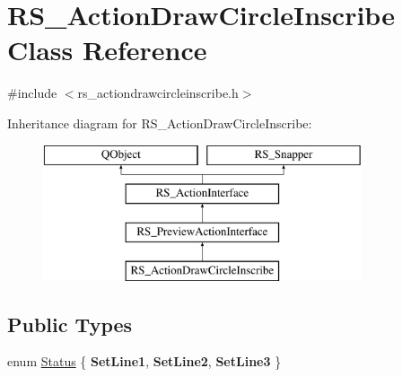 \hypertarget{classRS__ActionDrawCircleInscribe}{\section{R\-S\-\_\-\-Action\-Draw\-Circle\-Inscribe Class Reference}
\label{classRS__ActionDrawCircleInscribe}
}


{\ttfamily \#include $<$rs\-\_\-actiondrawcircleinscribe.\-h$>$}

Inheritance diagram for R\-S\-\_\-\-Action\-Draw\-Circle\-Inscribe\-:\begin{figure}[H]
\begin{center}
\leavevmode
\includegraphics[height=4.000000cm]{classRS__ActionDrawCircleInscribe}
\end{center}
\end{figure}
\subsection*{Public Types}
\begin{DoxyCompactItemize}
\item 
enum \hyperlink{classRS__ActionDrawCircleInscribe_a8fc9869ac02de3e075f94e0a39b8eacc}{Status} \{ {\bfseries Set\-Line1}, 
{\bfseries Set\-Line2}, 
{\bfseries Set\-Line3}
 \}
\end{DoxyCompactItemize}
